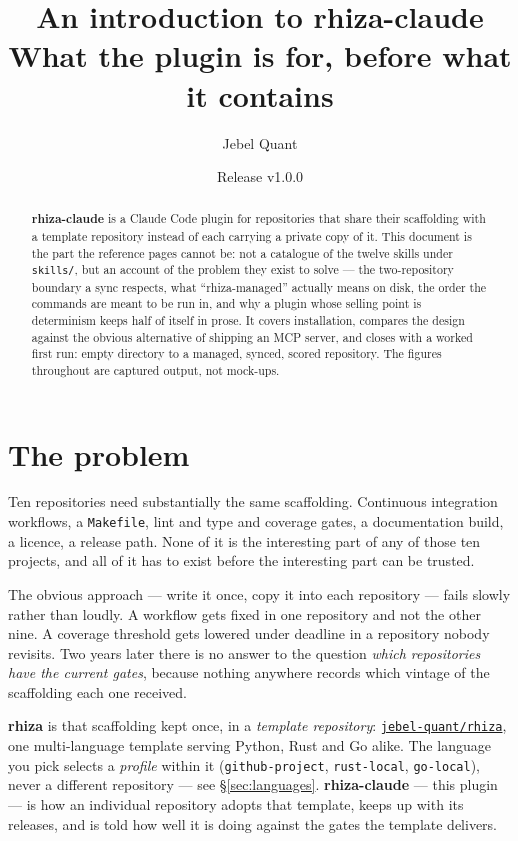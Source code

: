 \documentclass[11pt,a4paper]{article}
\title{\vspace{-1.4cm}\textbf{An introduction to rhiza-claude}\\[0.3em]
\large\color{slate} What the plugin is for, before what it contains}
\author{\normalsize Jebel Quant}
\date{\normalsize Release v1.0.0}
\newcommand{\file}[1]{\texttt{#1}}
\begin{document}
\maketitle
\thispagestyle{fancy}

\begin{abstract}
\noindent
\textbf{rhiza-claude} is a Claude Code plugin for repositories that share their
scaffolding with a template repository instead of each carrying a private copy of it.
This document is the part the reference pages cannot be: not a catalogue of the twelve
skills under \file{skills/}, but an account of the problem they exist to
solve --- the two-repository boundary a sync respects, what ``rhiza-managed'' actually
means on disk, the order the commands are meant to be run in, and why a plugin whose
selling point is determinism keeps half of itself in prose. It covers installation,
compares the design against the obvious alternative of shipping an MCP server, and
closes with a worked first run: empty directory to a managed, synced, scored
repository. The figures throughout are captured output, not mock-ups.
\end{abstract}

\section{The problem}

Ten repositories need substantially the same scaffolding. Continuous integration
workflows, a \file{Makefile}, lint and type and coverage gates, a documentation build,
a licence, a release path. None of it is the interesting part of any of those ten
projects, and all of it has to exist before the interesting part can be trusted.

The obvious approach --- write it once, copy it into each repository --- fails slowly
rather than loudly. A workflow gets fixed in one repository and not the other nine. A
coverage threshold gets lowered under deadline in a repository nobody revisits. Two
years later there is no answer to the question \emph{which repositories have the
current gates}, because nothing anywhere records which vintage of the scaffolding each
one received.

\textbf{rhiza} is that scaffolding kept once, in a \emph{template repository}:
\href{https://github.com/jebel-quant/rhiza}{\texttt{jebel-quant/rhiza}}, one
multi-language template serving Python, Rust and Go alike. The language you pick selects
a \emph{profile} within it (\texttt{github-project}, \texttt{rust-local},
\texttt{go-local}), never a different repository --- see \S\ref{sec:languages}.
\textbf{rhiza-claude} --- this plugin --- is how an
individual repository adopts that template, keeps up with its releases, and is told how
well it is doing against the gates the template delivers.
\end{document}
